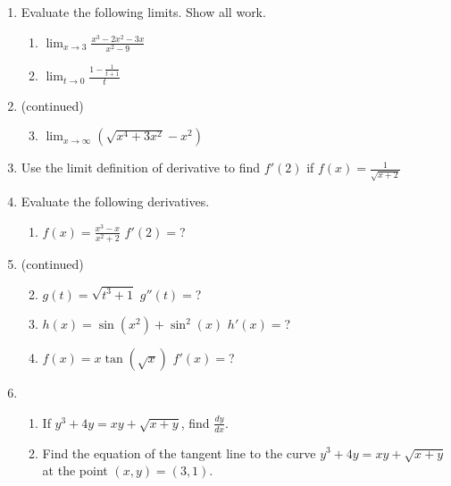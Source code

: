 \documentclass[12pt,legalpaper]{article}
\newcommand{\ds}{\displaystyle}
\begin{document}
\begin{enumerate}
\item Evaluate
  the following limits.  Show all work.
  \begin{enumerate}
  \item $\ds \lim_{x\to 3} \frac{x^3-2x^2-3x}{x^2-9}$
\vfill
  \item $\ds \lim_{t\to 0} \frac{\ds 1-\frac{1}{t+1}}{t}$
\vfill
  \end{enumerate}
\newpage
\addtocounter{enumi}{-1}
\item (continued)
  \begin{enumerate}
  \setcounter{enumii}{2}
  \item $\ds \lim_{x\to\infty} \left(\sqrt{x^4+3x^2}-x^2\right)$
\vfill
  \end{enumerate}
\item Use
  the limit definition of derivative to find $\ds f'(2)$ if 
  $\ds f(x) = \frac{1}{\sqrt{x+2}}$
\vfill
\vfill
\item Evaluate
   the following derivatives.
  \begin{enumerate}
  \item $\ds f(x) = \frac{x^3-x}{x^2+2}$ \hfill $\ds f'(2)=$? \hspace{2in}
\vfill
  \end{enumerate}
\newpage
\addtocounter{enumi}{-1}
\item (continued)
  \begin{enumerate}
  \setcounter{enumii}{1} %
  \item $\ds g(t) = \sqrt{t^3+1}$ \hfill $\ds g''(t)=$? \hspace{2in}
\vfill
  \item $\ds h(x) = \sin(x^2) + \sin^2(x)$ \hfill $h'(x)=$? \hspace{2in}
\vfill
  \item $\ds f(x) = x\tan(\sqrt{x})$ \hfill $f'(x)=$? \hspace{2in}
\vfill
  \end{enumerate}
\newpage
\item 
  \begin{enumerate}
  \item If
  $\ds y^3 +4y=xy+\sqrt{x+y}$, find $\ds\frac{dy}{dx}$.
\vfill
  \item Find the equation of the tangent line to the curve
    $\ds y^3+4y = xy+\sqrt{x+y}$ at the point $(x,y)=(3,1)$.
\vfill
  \end{enumerate}

\end{enumerate}
\end{document}
